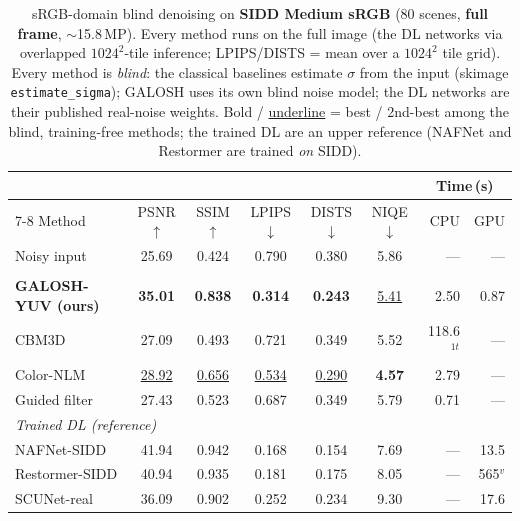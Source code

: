 
\begin{table}[t]
\centering
\caption{sRGB-domain blind denoising on \textbf{SIDD Medium sRGB} (80 scenes,
\textbf{full frame}, $\sim$15.8\,MP). Every method runs on the full image (the
DL networks via overlapped $1024^2$-tile inference; LPIPS/DISTS = mean over a
$1024^2$ tile grid). Every method is \emph{blind}: the classical baselines
estimate $\sigma$ from the input (skimage \texttt{estimate\_sigma}); GALOSH uses
its own blind noise model; the DL networks are their published real-noise
weights. Bold / \underline{underline} = best / 2nd-best among the blind,
training-free methods; the trained DL are an upper reference (NAFNet and
Restormer are trained \emph{on} SIDD).}
\label{tab:sidd_srgb}
\setlength{\tabcolsep}{3.2pt}
\begin{tabular}{l ccccc rr}
\toprule
 & & & & & & \multicolumn{2}{c}{Time\,(s)}\\
\cmidrule(lr){7-8}
Method & PSNR$\uparrow$ & SSIM$\uparrow$ & LPIPS$\downarrow$ & DISTS$\downarrow$ & NIQE$\downarrow$ & CPU & GPU\\
\midrule
Noisy input                & 25.69 & 0.424 & 0.790 & 0.380 & 5.86 & --- & ---\\
\addlinespace[2pt]
\multicolumn{8}{l}{\textit{Blind, training-free}}\\
\quad \textbf{GALOSH-YUV (ours)} & \textbf{35.01} & \textbf{0.838} & \textbf{0.314} & \textbf{0.243} & \underline{5.41} & 2.50 & 0.87\\
\quad CBM3D                & 27.09 & 0.493 & 0.721 & 0.349 & 5.52 & 118.6$^{1t}$ & ---\\
\quad Color-NLM            & \underline{28.92} & \underline{0.656} & \underline{0.534} & \underline{0.290} & \textbf{4.57} & 2.79 & ---\\
\quad Guided filter        & 27.43 & 0.523 & 0.687 & 0.349 & 5.79 & 0.71 & ---\\
\midrule
\multicolumn{8}{l}{\textit{Trained DL (reference)}}\\
\quad NAFNet-SIDD          & 41.94 & 0.942 & 0.168 & 0.154 & 7.69 & --- & 13.5\\
\quad Restormer-SIDD       & 40.94 & 0.935 & 0.181 & 0.175 & 8.05 & --- & 565$^{v}$\\
\quad SCUNet-real          & 36.09 & 0.902 & 0.252 & 0.234 & 9.30 & --- & 17.6\\
\bottomrule
\end{tabular}


\end{table}

